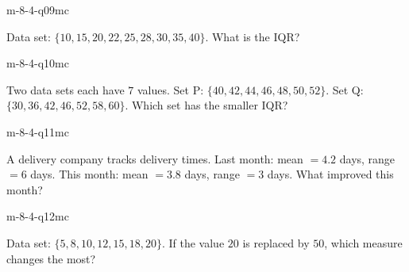\begin{practiceQuestion}{m-8-4-q09}{mc}
\begin{questionText}
Data set: $\{10, 15, 20, 22, 25, 28, 30, 35, 40\}$. What is the IQR?
\end{questionText}
\end{practiceQuestion}

\begin{practiceQuestion}{m-8-4-q10}{mc}
\begin{questionText}
Two data sets each have $7$ values. Set P: $\{40, 42, 44, 46, 48, 50, 52\}$. Set Q: $\{30, 36, 42, 46, 52, 58, 60\}$. Which set has the smaller IQR?
\end{questionText}
\end{practiceQuestion}

\begin{practiceQuestion}{m-8-4-q11}{mc}
\begin{questionText}
A delivery company tracks delivery times. Last month: mean $= 4.2$ days, range $= 6$ days. This month: mean $= 3.8$ days, range $= 3$ days. What improved this month?
\end{questionText}
\end{practiceQuestion}

\begin{practiceQuestion}{m-8-4-q12}{mc}
\begin{questionText}
Data set: $\{5, 8, 10, 12, 15, 18, 20\}$. If the value $20$ is replaced by $50$, which measure changes the most?
\end{questionText}
\end{practiceQuestion}

